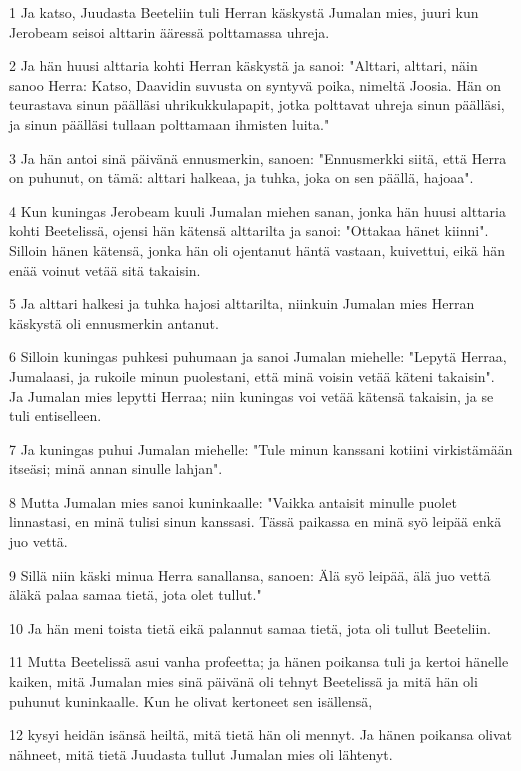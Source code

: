 \par 1 Ja katso, Juudasta Beeteliin tuli Herran käskystä Jumalan mies, juuri kun Jerobeam seisoi alttarin ääressä polttamassa uhreja.
\par 2 Ja hän huusi alttaria kohti Herran käskystä ja sanoi: "Alttari, alttari, näin sanoo Herra: Katso, Daavidin suvusta on syntyvä poika, nimeltä Joosia. Hän on teurastava sinun päälläsi uhrikukkulapapit, jotka polttavat uhreja sinun päälläsi, ja sinun päälläsi tullaan polttamaan ihmisten luita."
\par 3 Ja hän antoi sinä päivänä ennusmerkin, sanoen: "Ennusmerkki siitä, että Herra on puhunut, on tämä: alttari halkeaa, ja tuhka, joka on sen päällä, hajoaa".
\par 4 Kun kuningas Jerobeam kuuli Jumalan miehen sanan, jonka hän huusi alttaria kohti Beetelissä, ojensi hän kätensä alttarilta ja sanoi: "Ottakaa hänet kiinni". Silloin hänen kätensä, jonka hän oli ojentanut häntä vastaan, kuivettui, eikä hän enää voinut vetää sitä takaisin.
\par 5 Ja alttari halkesi ja tuhka hajosi alttarilta, niinkuin Jumalan mies Herran käskystä oli ennusmerkin antanut.
\par 6 Silloin kuningas puhkesi puhumaan ja sanoi Jumalan miehelle: "Lepytä Herraa, Jumalaasi, ja rukoile minun puolestani, että minä voisin vetää käteni takaisin". Ja Jumalan mies lepytti Herraa; niin kuningas voi vetää kätensä takaisin, ja se tuli entiselleen.
\par 7 Ja kuningas puhui Jumalan miehelle: "Tule minun kanssani kotiini virkistämään itseäsi; minä annan sinulle lahjan".
\par 8 Mutta Jumalan mies sanoi kuninkaalle: "Vaikka antaisit minulle puolet linnastasi, en minä tulisi sinun kanssasi. Tässä paikassa en minä syö leipää enkä juo vettä.
\par 9 Sillä niin käski minua Herra sanallansa, sanoen: Älä syö leipää, älä juo vettä äläkä palaa samaa tietä, jota olet tullut."
\par 10 Ja hän meni toista tietä eikä palannut samaa tietä, jota oli tullut Beeteliin.
\par 11 Mutta Beetelissä asui vanha profeetta; ja hänen poikansa tuli ja kertoi hänelle kaiken, mitä Jumalan mies sinä päivänä oli tehnyt Beetelissä ja mitä hän oli puhunut kuninkaalle. Kun he olivat kertoneet sen isällensä,
\par 12 kysyi heidän isänsä heiltä, mitä tietä hän oli mennyt. Ja hänen poikansa olivat nähneet, mitä tietä Juudasta tullut Jumalan mies oli lähtenyt.
